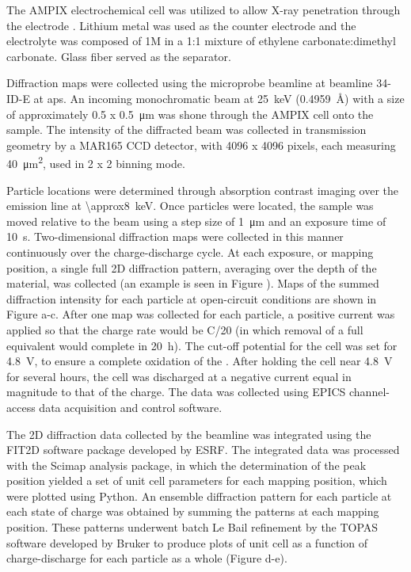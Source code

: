 \documentclass{article}
\begin{document}
The AMPIX electrochemical cell was utilized to allow X-ray penetration
through the electrode \cite{borkiewicz2012}. Lithium metal was used as
the counter electrode and the electrolyte was composed of 1M
 in a 1:1 mixture of ethylene carbonate:dimethyl
carbonate. Glass fiber served as the separator.

Diffraction maps were collected using the microprobe beamline at
beamline 34-ID-E at \gls{aps}. An incoming monochromatic beam at
\SI{25}{\kilo\electronvolt} (\SI{0.4959}{\angstrom}) with a size of
approximately \num{0.5} x \SI{0.5}{\micro\meter} was shone through the
AMPIX cell onto the sample. The intensity of the diffracted beam was
collected in transmission geometry by a MAR165 CCD detector, with 4096
x 4096 pixels, each measuring \SI{40}{\square\micro\meter}, used in 2
x 2 binning mode.

Particle locations were determined through absorption contrast imaging
over the  emission line at
\SI{\approx8}{\kilo\electronvolt}. Once particles were located, the
sample was moved relative to the beam using a step size of
\SI{1}{\micro\meter} and an exposure time of
\SI{10}{\second}. Two-dimensional diffraction maps were collected in
this manner continuously over the charge-discharge cycle. At each
exposure, or mapping position, a single full 2D diffraction pattern,
averaging over the depth of the material, was collected (an example is
seen in Figure ). Maps of the summed diffraction
intensity for each particle at open-circuit conditions are shown in
Figure a-c.  After one map was collected for
each particle, a positive current was applied so that the charge rate
would be C/20 (in which removal of a full  equivalent would
complete in \SI{20}{\hour}). The cut-off potential for the cell was
set for \SI{4.8}{\volt}, to ensure a complete oxidation of the
\nca{}. After holding the cell near \SI{4.8}{\volt} for several hours,
the cell was discharged at a negative current equal in magnitude to
that of the charge. The data was collected using EPICS channel-access
data acquisition and control software.

The 2D diffraction data collected by the beamline was integrated using
the FIT2D software package developed by
ESRF\cite{hausermann1996,hammersley1997}. The integrated data was
processed with the Scimap analysis package\cite{scimap}, in which the
determination of the peak position yielded a set of unit cell
parameters for each mapping position, which were plotted using
Python. An ensemble diffraction pattern for each particle at each
state of charge was obtained by summing the patterns at each mapping
position. These patterns underwent batch Le Bail refinement by the
TOPAS software developed by Bruker to produce plots of unit cell as a
function of charge-discharge for each particle as a whole (Figure
d-e).
\end{document}
